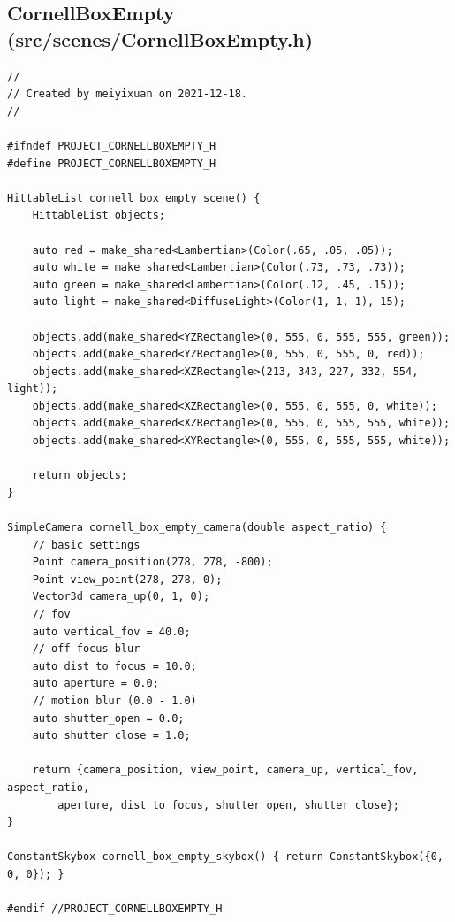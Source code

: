 \documentclass[utf8]{article}
\begin{document}
\subsection{CornellBoxEmpty (src/scenes/CornellBoxEmpty.h)}
\begin{lstlisting}[style=CStyle]
//
// Created by meiyixuan on 2021-12-18.
//

#ifndef PROJECT_CORNELLBOXEMPTY_H
#define PROJECT_CORNELLBOXEMPTY_H

HittableList cornell_box_empty_scene() {
	HittableList objects;
	
	auto red = make_shared<Lambertian>(Color(.65, .05, .05));
	auto white = make_shared<Lambertian>(Color(.73, .73, .73));
	auto green = make_shared<Lambertian>(Color(.12, .45, .15));
	auto light = make_shared<DiffuseLight>(Color(1, 1, 1), 15);
	
	objects.add(make_shared<YZRectangle>(0, 555, 0, 555, 555, green));
	objects.add(make_shared<YZRectangle>(0, 555, 0, 555, 0, red));
	objects.add(make_shared<XZRectangle>(213, 343, 227, 332, 554, light));
	objects.add(make_shared<XZRectangle>(0, 555, 0, 555, 0, white));
	objects.add(make_shared<XZRectangle>(0, 555, 0, 555, 555, white));
	objects.add(make_shared<XYRectangle>(0, 555, 0, 555, 555, white));
	
	return objects;
}

SimpleCamera cornell_box_empty_camera(double aspect_ratio) {
	// basic settings
	Point camera_position(278, 278, -800);
	Point view_point(278, 278, 0);
	Vector3d camera_up(0, 1, 0);
	// fov
	auto vertical_fov = 40.0;
	// off focus blur
	auto dist_to_focus = 10.0;
	auto aperture = 0.0;
	// motion blur (0.0 - 1.0)
	auto shutter_open = 0.0;
	auto shutter_close = 1.0;
	
	return {camera_position, view_point, camera_up, vertical_fov, aspect_ratio,
		aperture, dist_to_focus, shutter_open, shutter_close};
}

ConstantSkybox cornell_box_empty_skybox() { return ConstantSkybox({0, 0, 0}); }

#endif //PROJECT_CORNELLBOXEMPTY_H

\end{lstlisting}
\end{document}
